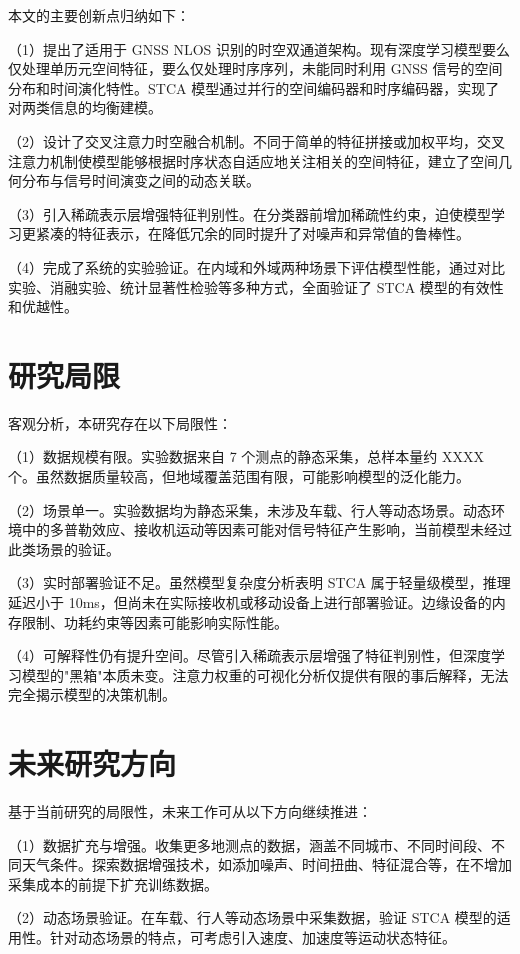 本文的主要创新点归纳如下：

（1）提出了适用于 GNSS NLOS 识别的时空双通道架构。现有深度学习模型要么仅处理单历元空间特征，要么仅处理时序序列，未能同时利用 GNSS 信号的空间分布和时间演化特性。STCA 模型通过并行的空间编码器和时序编码器，实现了对两类信息的均衡建模。

（2）设计了交叉注意力时空融合机制。不同于简单的特征拼接或加权平均，交叉注意力机制使模型能够根据时序状态自适应地关注相关的空间特征，建立了空间几何分布与信号时间演变之间的动态关联。

（3）引入稀疏表示层增强特征判别性。在分类器前增加稀疏性约束，迫使模型学习更紧凑的特征表示，在降低冗余的同时提升了对噪声和异常值的鲁棒性。

（4）完成了系统的实验验证。在内域和外域两种场景下评估模型性能，通过对比实验、消融实验、统计显著性检验等多种方式，全面验证了 STCA 模型的有效性和优越性。

\section{研究局限}

客观分析，本研究存在以下局限性：

（1）数据规模有限。实验数据来自 7 个测点的静态采集，总样本量约 XXXX 个。虽然数据质量较高，但地域覆盖范围有限，可能影响模型的泛化能力。

（2）场景单一。实验数据均为静态采集，未涉及车载、行人等动态场景。动态环境中的多普勒效应、接收机运动等因素可能对信号特征产生影响，当前模型未经过此类场景的验证。

（3）实时部署验证不足。虽然模型复杂度分析表明 STCA 属于轻量级模型，推理延迟小于 10ms，但尚未在实际接收机或移动设备上进行部署验证。边缘设备的内存限制、功耗约束等因素可能影响实际性能。

（4）可解释性仍有提升空间。尽管引入稀疏表示层增强了特征判别性，但深度学习模型的"黑箱"本质未变。注意力权重的可视化分析仅提供有限的事后解释，无法完全揭示模型的决策机制。

\section{未来研究方向}

基于当前研究的局限性，未来工作可从以下方向继续推进：

（1）数据扩充与增强。收集更多地测点的数据，涵盖不同城市、不同时间段、不同天气条件。探索数据增强技术，如添加噪声、时间扭曲、特征混合等，在不增加采集成本的前提下扩充训练数据。

（2）动态场景验证。在车载、行人等动态场景中采集数据，验证 STCA 模型的适用性。针对动态场景的特点，可考虑引入速度、加速度等运动状态特征。

